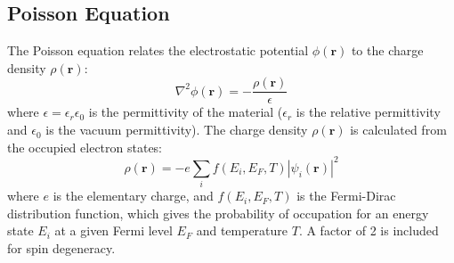 \documentclass{article}
\begin{document}
\subsection{Poisson Equation}
The Poisson equation relates the electrostatic potential $\phi(\mathbf{r})$ to the charge density $\rho(\mathbf{r})$:
\begin{equation}
    \nabla^2 \phi(\mathbf{r}) = -\frac{\rho(\mathbf{r})}{\epsilon}
\end{equation}
where $\epsilon = \epsilon_r \epsilon_0$ is the permittivity of the material ($\epsilon_r$ is the relative permittivity and $\epsilon_0$ is the vacuum permittivity). The charge density $\rho(\mathbf{r})$ is calculated from the occupied electron states:
\begin{equation}
    \rho(\mathbf{r}) = -e \sum_i f(E_i, E_F, T) |\psi_i(\mathbf{r})|^2
\end{equation}
where $e$ is the elementary charge, and $f(E_i, E_F, T)$ is the Fermi-Dirac distribution function, which gives the probability of occupation for an energy state $E_i$ at a given Fermi level $E_F$ and temperature $T$. A factor of 2 is included for spin degeneracy.
\end{document}
